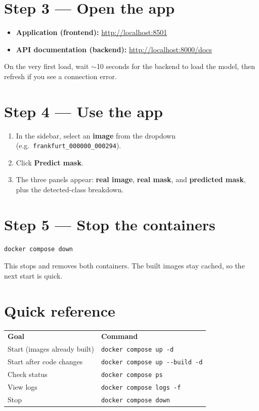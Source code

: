 \documentclass[11pt,a4paper]{article}
\begin{document}
\section*{Step 3 --- Open the app}
\begin{itemize}[leftmargin=1.5em]
  \item \textbf{Application (frontend):} \url{http://localhost:8501}
  \item \textbf{API documentation (backend):} \url{http://localhost:8000/docs}
\end{itemize}
On the very first load, wait $\sim$10 seconds for the backend to load the model,
then refresh if you see a connection error.

\section*{Step 4 --- Use the app}
\begin{enumerate}[leftmargin=1.5em]
  \item In the sidebar, select an \textbf{image} from the dropdown
        (e.g.\ \texttt{frankfurt\_000000\_000294}).
  \item Click \textbf{Predict mask}.
  \item The three panels appear: \textbf{real image}, \textbf{real mask}, and
        \textbf{predicted mask}, plus the detected-class breakdown.
\end{enumerate}

\section*{Step 5 --- Stop the containers}
\begin{lstlisting}
docker compose down
\end{lstlisting}
This stops and removes both containers. The built images stay cached, so the
next start is quick.

\section*{Quick reference}
\begin{center}
\begin{tabular}{ll}
\textbf{Goal} & \textbf{Command} \\[2pt]
Start (images already built) & \texttt{docker compose up -d} \\
Start after code changes      & \texttt{docker compose up -{}-build -d} \\
Check status                  & \texttt{docker compose ps} \\
View logs                     & \texttt{docker compose logs -f} \\
Stop                          & \texttt{docker compose down} \\
\end{tabular}
\end{center}
\end{document}
